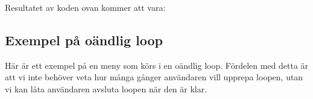 \hypertarget{cb2}{}
\begin{Shaded}
\begin{Highlighting}[]
 \OperatorTok{(}\OperatorTok{)} \OperatorTok{\{}
    \OperatorTok{(}\OperatorTok{);}
    \OperatorTok{(}\OperatorTok{);}
    \OperatorTok{(}\OperatorTok{);}
    \OperatorTok{(}\OperatorTok{);}
    \OperatorTok{(}\OperatorTok{);}
\OperatorTok{\}}
\end{Highlighting}
\end{Shaded}

Resultatet av koden ovan kommer att vara:

\begin{Shaded}
\begin{Highlighting}[]
\end{Highlighting}
\end{Shaded}

\hypertarget{exempel-puxe5-ouxe4ndlig-loop}{%
\subsection{Exempel på oändlig
loop}\label{exempel-puxe5-ouxe4ndlig-loop}}

Här är ett exempel på en meny som körs i en oändlig loop. Fördelen med
detta är att vi inte behöver veta hur många gånger användaren vill
upprepa loopen, utan vi kan låta användaren avsluta loopen när den är
klar.

